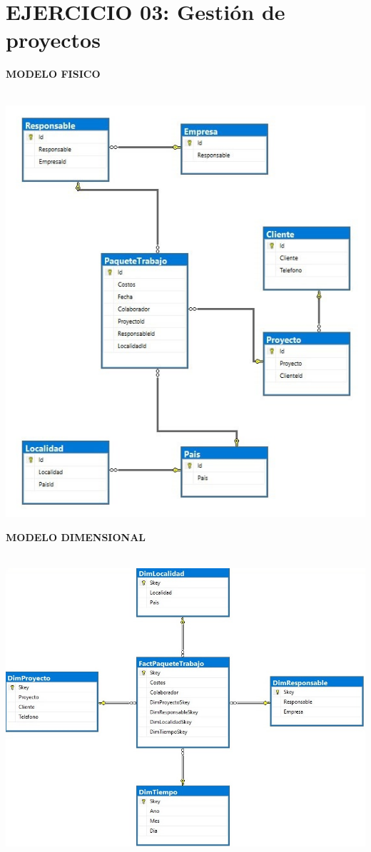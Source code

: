 \section{EJERCICIO 03: Gestión de proyectos } 

\textbf{MODELO FISICO}\\\\
\begin{center}
\includegraphics[width=\columnwidth]{images/task3/e3}\newline
\end{center}

\textbf{MODELO DIMENSIONAL}\\\\
\begin{center}
\includegraphics[width=\columnwidth]{images/task3/d3}\newline
\end{center}